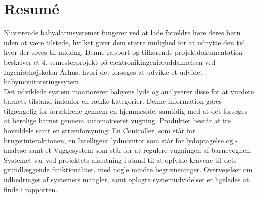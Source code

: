 \chapter{Resumé} \label{resume}

Nuværende babyalarmsystemer fungerer ved at lade forældre høre deres børn uden at være tilstede, hvilket giver dem større mulighed for at udnytte den tid hvor der soves til middag.
Denne rapport og tilhørende projektdokumentation beskriver et 4. semesterprojekt på elektronikingeniøruddannelsen ved Ingeniørhøjskolen Århus, hvori det forsøges at udvikle et udvidet babymonitoreringssytem.\\
Det udviklede system monitorerer babyens lyde og analyserer disse for at vurdere barnets tilstand indenfor en række kategorier. Denne information gøres tilgængelig for forældrene gennem en hjemmeside, samtidig med at det forsøges at berolige barnet gennem automatiseret vugning.
Produktet består af tre hoveddele samt en strømforsyning: En Controller, som står for brugerinteraktionen, en Intelligent lydmonitor som står for lydoptagelse og -analyse samt et Vuggesystem som står for at regulere vugningen af barnevognen. \\
Systemet var ved projektets afslutning i stand til at opfylde kravene til dets grundlæggende funktionalitet, med nogle mindre begrænsninger. Overvejelser om udbedringer af systemets mangler, samt oplagte systemudvidelser er ligeledes at finde i rapporten.\\